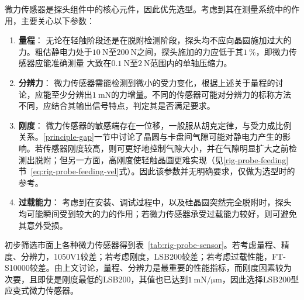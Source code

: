 微力传感器是探头组件中的核心元件，因此优先选型。考虑到其在测量系统中的作用，主要关心以下参数：

\begin{enumerate}
  \item \textbf{量程}：
    无论在轻触阶段还是在脱附检测阶段，探头均不应向晶圆施加过大的力。粗估静电力处于$\SI{10}{\newton}$至$\SI{200}{\newton}$之间，探头施加的力应低于其$1 ~\%$，即微力传感器应能准确测量 大致在$\SI{0.1}{\newton}$至$\SI{2}{\newton}$范围内的单轴压缩力。
  \item \textbf{分辨力}：
    微力传感器需能检测到微小的受力变化，根据上述关于量程的讨论，应能至少分辨出$\SI{1}{\milli\newton}$的力增量。不同的传感器可能对分辨力的标称方法不同，应结合其输出信号特点，判定其是否满足要求。
  \item \textbf{刚度}：
    微力传感器的敏感端存在一位移，一般服从胡克定律，与受力成比例关系。\ref{principle-gap}一节中讨论了晶圆与卡盘间气隙可能对静电力产生的影响。若传感器刚度较高，则可更好地控制气隙大小，并在气隙明显扩大之前检测出脱附；但另一方面，高刚度使轻触晶圆更难实现（见\ref{rig-probe-feeding}节\ \eqref{eq:rig-probe-feeding-vel}式）。因此该参数并无明确要求，仅做为选型时的参考。
  \item \textbf{过载能力}：
    考虑到在安装、调试过程中，以及硅晶圆突然完全脱附时，探头均可能瞬间受到较大的力的作用；若微力传感器承受过载能力较好，则可避免其意外受损。
\end{enumerate}

初步筛选市面上各种微力传感器得到表~\ref{tab:rig-probe-sensor}。若考虑量程、精度、分辨力，1050V1较差；若考虑刚度，LSB200较差；若考虑过载性能，FT-S10000较差。由上文讨论，量程、分辨力是最重要的性能指标，而刚度因素较为次要，且即使是刚度最低的LSB200，其值也已达到$\SI[per-mode=symbol]{1}{\milli\newton\per\micro\meter}$，因此选择LSB200型应变式微力传感器。

